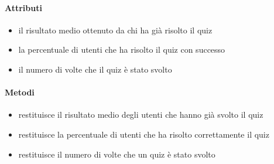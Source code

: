 \paragraph{Attributi}
\begin{itemize}
\item {}
\newline
il risultato medio ottenuto da chi ha già risolto il quiz
\item {}
\newline
la percentuale di utenti che ha risolto il quiz con successo
\item {}
\newline
il numero di volte che il quiz è stato svolto
\end{itemize}
\paragraph{Metodi}
\begin{itemize}
\item {}
\newline
restituisce il risultato medio degli utenti che hanno già svolto il quiz
\newline
\item {}
\newline
restituisce la percentuale di utenti che ha risolto correttamente il quiz
\newline
\item {}
\newline
restituisce il numero di volte che un quiz è stato svolto
\newline
\end{itemize}
